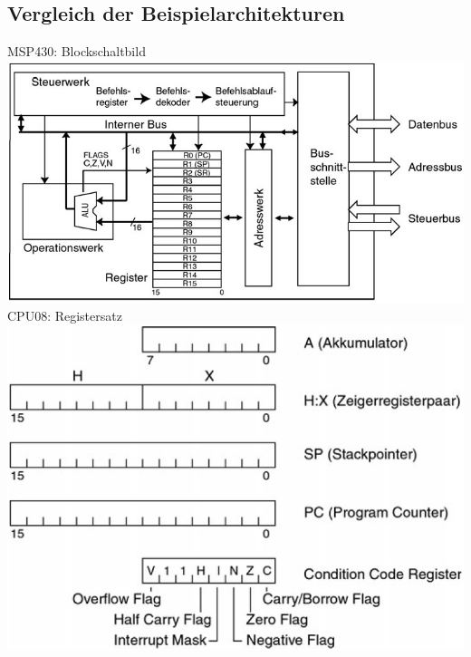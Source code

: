 \begin{minipage}{0.6\textwidth}
    \subsection{Vergleich der Beispielarchitekturen}
    \vspace{-1.5\baselineskip}
    \begin{multicols}{2}
        MSP430: Blockschaltbild\\
	    \includegraphics[width = 1.2\linewidth]{images/Plattformen/MSP430Blockschaltbild}
	\columnbreak
    	\flushright{}
	    CPU08: Registersatz\\
	    \includegraphics[width = 0.8\linewidth]{images/Plattformen/CPU08Register}
	\end{multicols}
\end{minipage}
